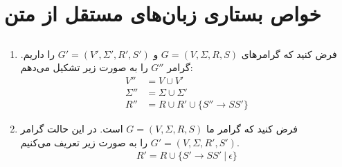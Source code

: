 \section{خواص بستاری زبان‌های مستقل از متن}
\subsection{}
\begin{enumerate}
    \item فرض کنید که گرامرهای
    $G = (V, \Sigma, R, S)$ و $G' = (V', \Sigma', R', S')$
    را داریم. گرامر
    $G''$
    را به صورت زیر تشکیل می‌دهم:
    \begin{align*}
        V'' &= V \cup V'\\
        \Sigma'' &= \Sigma \cup \Sigma'\\
        R'' &= R \cup R' \cup \{S'' \rightarrow SS'\}
    \end{align*}
    \item فرض کنید که گرامر ما
    $G = (V, \Sigma, R, S)$
    است. در این حالت گرامر
    $G' = (V, \Sigma, R', S')$
    را به صورت زیر تعریف می‌کنیم.
    \begin{align*}
        R' = R \cup \{S' \rightarrow SS' ~|~ \epsilon\}
    \end{align*}
\end{enumerate}

